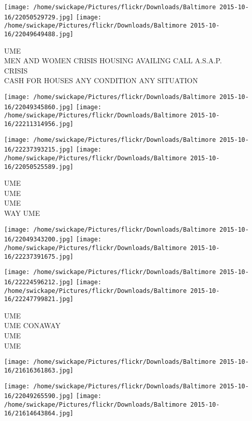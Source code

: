 \documentclass[10pt,letterpaper]{article}
\begin{document}
\texttt{[image: /home/swickape/Pictures/flickr/Downloads/Baltimore 2015-10-16/22050529729.jpg]}
\texttt{[image: /home/swickape/Pictures/flickr/Downloads/Baltimore 2015-10-16/22049649488.jpg]}

UME\\
MEN AND WOMEN CRISIS HOUSING AVAILING CALL A.S.A.P.\\
CRISIS\\
CASH FOR HOUSES ANY CONDITION ANY SITUATION\\
\pagebreak

\texttt{[image: /home/swickape/Pictures/flickr/Downloads/Baltimore 2015-10-16/22049345860.jpg]}
\texttt{[image: /home/swickape/Pictures/flickr/Downloads/Baltimore 2015-10-16/22211314956.jpg]}

\texttt{[image: /home/swickape/Pictures/flickr/Downloads/Baltimore 2015-10-16/22237393215.jpg]}
\texttt{[image: /home/swickape/Pictures/flickr/Downloads/Baltimore 2015-10-16/22050525589.jpg]}

UME\\
UME\\
UME\\
WAY UME\\
\pagebreak

\texttt{[image: /home/swickape/Pictures/flickr/Downloads/Baltimore 2015-10-16/22049343200.jpg]}
\texttt{[image: /home/swickape/Pictures/flickr/Downloads/Baltimore 2015-10-16/22237391675.jpg]}

\texttt{[image: /home/swickape/Pictures/flickr/Downloads/Baltimore 2015-10-16/22224596212.jpg]}
\texttt{[image: /home/swickape/Pictures/flickr/Downloads/Baltimore 2015-10-16/22247799821.jpg]}

UME\\
UME CONAWAY\\
UME\\
UME\\
\pagebreak

\texttt{[image: /home/swickape/Pictures/flickr/Downloads/Baltimore 2015-10-16/21616361863.jpg]}

\vspace{0.25in}
\texttt{[image: /home/swickape/Pictures/flickr/Downloads/Baltimore 2015-10-16/22049265590.jpg]}
\texttt{[image: /home/swickape/Pictures/flickr/Downloads/Baltimore 2015-10-16/21614643864.jpg]}
\end{document}
